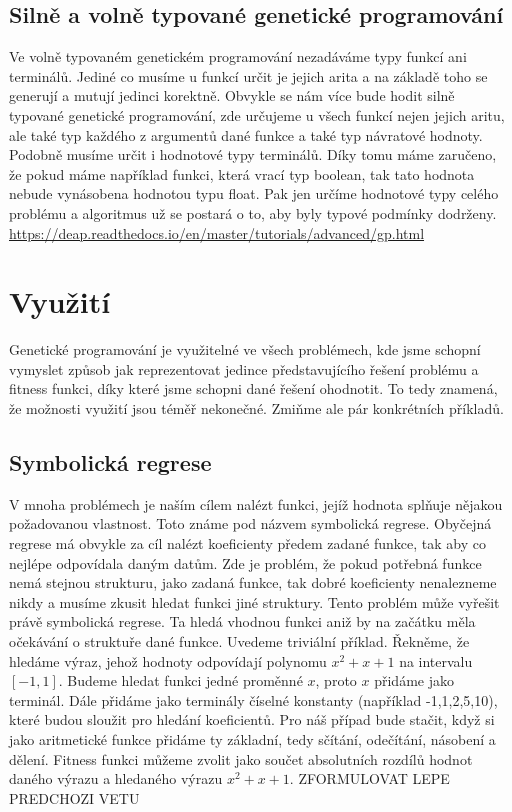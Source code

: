 \subsection{Silně a volně typované genetické programování}
Ve volně typovaném genetickém programování nezadáváme typy funkcí ani terminálů. Jediné co musíme u funkcí určit je jejich arita a na základě toho se generují a mutují jedinci korektně.
Obvykle se nám více bude hodit silně typované genetické programování, zde určujeme u všech funkcí nejen jejich aritu, ale také typ každého z argumentů dané funkce a také typ návratové hodnoty.
Podobně musíme určit i hodnotové typy terminálů. Díky tomu máme zaručeno, že pokud máme například funkci, která vrací typ boolean, tak tato hodnota nebude vynásobena hodnotou typu float. 
Pak jen určíme hodnotové typy celého problému a algoritmus už se postará o to, aby byly typové podmínky dodrženy.
\url{https://deap.readthedocs.io/en/master/tutorials/advanced/gp.html}

\section{Využití}
Genetické programování je využitelné ve všech problémech, kde jsme schopní vymyslet způsob jak reprezentovat jedince představujícího řešení problému a fitness funkci, díky které jsme schopni dané řešení ohodnotit.
To tedy znamená, že možnosti využití jsou téměř nekonečné. Zmiňme ale pár konkrétních příkladů. 

\subsection{Symbolická regrese}
V mnoha problémech je naším cílem nalézt funkci, jejíž hodnota splňuje nějakou požadovanou vlastnost. Toto známe pod názvem symbolická regrese.
Obyčejná regrese má obvykle za cíl nalézt koeficienty předem zadané funkce, tak aby co nejlépe odpovídala daným datům.
Zde je problém, že pokud potřebná funkce nemá stejnou strukturu, jako zadaná funkce, tak dobré koeficienty nenalezneme nikdy a musíme zkusit hledat funkci jiné struktury.
Tento problém může vyřešit právě symbolická regrese. Ta hledá vhodnou funkci aniž by na začátku měla očekávání o struktuře dané funkce.
Uvedeme triviální příklad. Řekněme, že hledáme výraz, jehož hodnoty odpovídají polynomu $x^2+x+1$ na intervalu $[-1,1]$.
Budeme hledat funkci jedné proměnné $x$, proto $x$ přidáme jako terminál. Dále přidáme jako terminály číselné konstanty (například -1,1,2,5,10), které budou sloužit pro hledání koeficientů.
Pro náš případ bude stačit, když si jako aritmetické funkce přidáme ty základní, tedy sčítání, odečítání, násobení a dělení.
Fitness funkci můžeme zvolit jako součet absolutních rozdílů hodnot daného výrazu a hledaného výrazu $x^2+x+1$.
ZFORMULOVAT LEPE PREDCHOZI VETU


